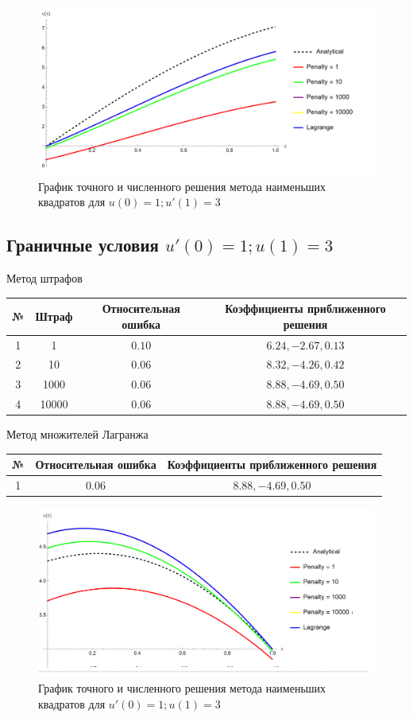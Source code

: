 \documentclass[12pt,a4paper]{article}
\begin{document}
\begin{figure}[h]
	\centering
	\includegraphics[width=1\textwidth]{m-3-2.PNG}
	\caption{График точного и численного решения метода наименьших квадратов для $u(0) = 1; u'(1) = 3$}
\end{figure}


\subsection{Граничные условия $u'(0) = 1; u(1) = 3$}

\begin{center}
	Метод штрафов
	\begin{tabular}{|c|c|c|c|} 
		\hline
		№ & Штраф & Относительная ошибка & Коэффициенты приближенного решения \\ 
		\hline
		1 & 1 &$0.10$ & ${6.24,-2.67,0.13}$ \\ 
		\hline
		2 & 10 &$0.06$ & ${8.32,-4.26,0.42}$ \\ 
		\hline
		3 & 1000 &$0.06$ & ${8.88,-4.69,0.50}$ \\ 
		\hline
		4 & 10000 &$0.06$ & ${8.88,-4.69,0.50}$ \\ 
		\hline
	\end{tabular}
\end{center}

\begin{center}
	Метод множителей Лагранжа
	\begin{tabular}{|c|c|c|} 
		\hline
		№ & Относительная ошибка & Коэффициенты приближенного решения \\ 
		\hline
		1 & $0.06$ & ${8.88,-4.69,0.50}$ \\ 
		\hline
	\end{tabular}
\end{center}

\begin{figure}[h]
	\centering
	\includegraphics[width=1\textwidth]{m-3-3.PNG}
	\caption{График точного и численного решения метода наименьших квадратов для $u' (0) = 1; u(1) = 3$}
\end{figure}


    \pagebreak
\end{document}
